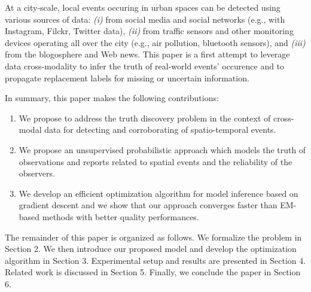 At a city-scale, local events occuring in urban spaces can be detected using various sources of data: {\it (i)} from social media and social networks 
(e.g., with  Instagram, Filckr, Twitter data), {\it (ii)} from traffic sensors and other monitoring devices operating all over the city (e.g., air pollution, bluetooth sensors), and {\it (iii)} from the blogosphere and Web news. This paper is a first attempt to leverage data cross-modality to infer the truth of  real-world events' occurence and to propagate replacement labels for missing or uncertain information.



 

 In summary, this paper makes the following contributions:
 \begin{enumerate}
\item We propose to address the truth discovery problem in the context of cross-modal data for detecting and corroborating of spatio-temporal events.
\item We propose an unsupervised  probabilistic approach  which models the truth of observations and reports related to spatial events and the reliability of the observers. 
\item We develop an efficient optimization algorithm for model inference based on gradient descent and we show that our approach converges faster than EM-based methods with better quality performances.
 \end{enumerate}

The remainder of this paper is organized as follows. We formalize the problem in Section 2.  
We then introduce our proposed model and develop the optimization algorithm in Section 3. 
Experimental setup and results are presented in Section 4. 
Related work is discussed in Section 5. Finally, we conclude the paper in Section 6.
